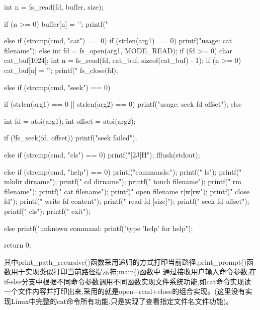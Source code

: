 \begin{ccode}
{{{{                int n = fs_read(fd, buffer, size);

                if (n >= 0) {
                    buffer[n] = '\0';
                    printf("%
                }
            }
        }

        else if (strcmp(cmd, "cat") == 0) {
            if (strlen(arg1) == 0) {
                printf("usage: cat filename\n");
            } else {
                int fd = fs_open(arg1, MODE_READ);
                if (fd >= 0) {
                    char cat_buf[1024];
                    int n = fs_read(fd, cat_buf, sizeof(cat_buf) - 1);
                    if (n >= 0) {
                        cat_buf[n] = '\0';
                        printf("%
                    }
                    fs_close(fd);
                }
            }
        }

        else if (strcmp(cmd, "seek") == 0) {
            if (strlen(arg1) == 0 || strlen(arg2) == 0) {
                printf("usage: seek fd offset\n");
            } else {
                int fd = atoi(arg1);
                int offset = atoi(arg2);

                if (!fs_seek(fd, offset)) {
                    printf("seek failed\n");
                }
            }
        }

        else if (strcmp(cmd, "cls") == 0) {
            printf("[2J[H");
            fflush(stdout);
        }

        else if (strcmp(cmd, "help") == 0) {
            printf("commands:\n");
            printf("  ls\n");
            printf("  mkdir dirname\n");
            printf("  cd dirname\n");
            printf("  touch filename\n");
            printf("  rm filename\n");
            printf("  cat filename\n");
            printf("  open filename r|w|rw\n");
            printf("  close fd\n");
            printf("  write fd content\n");
            printf("  read fd [size]\n");
            printf("  seek fd offset\n");
            printf("  cls\n");
            printf("  exit\n");
        }

        else {
            printf("unknown command: %
            printf("type 'help' for help\n");
        }
    }
    return 0;
}
\end{ccode}
其中print\_path\_recursive()函数采用递归的方式打印当前路径;print\_prompt()函数用于实现类似打印当前路径提示符;main()函数中
通过接收用户输入命令参数,在if-else分支中根据不同命令参数调用不同函数实现文件系统功能,如cat命令实现读一个文件内容并打印出来,采用的就是open+read+close的组合实现。(这里没有实现Linux中完整的cat命令所有功能,只是实现了查看指定文件名文件功能)。
